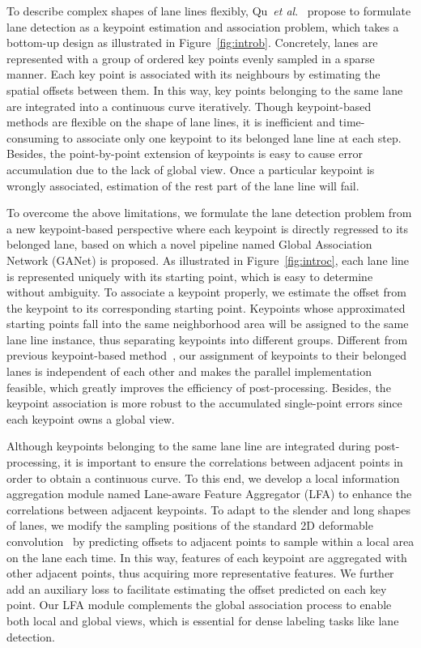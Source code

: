 \documentclass[10pt,twocolumn,letterpaper]{article}
\begin{document}
To describe complex shapes of lane lines flexibly, Qu~\textit{et al}.~\cite{Qu_2021_CVPR} propose to formulate lane detection as a keypoint estimation and association problem, which takes a bottom-up design as illustrated in Figure~\ref{fig:introb}.
Concretely, lanes are represented with a group of ordered key points evenly sampled in a sparse manner. 
Each key point is associated with its neighbours by estimating the spatial offsets between them.
In this way, key points belonging to the same lane are integrated into a continuous curve iteratively.
Though keypoint-based methods are flexible on the shape of lane lines, it is inefficient and time-consuming to associate only one keypoint to its belonged lane line at each step.
Besides, the point-by-point extension of keypoints is easy to cause error accumulation due to the lack of global view.
Once a particular keypoint is wrongly associated, estimation of the rest part of the lane line will fail.

To overcome the above limitations, we formulate the lane detection problem from a new keypoint-based perspective where each keypoint is directly regressed to its belonged lane, based on which a novel pipeline named Global Association Network (GANet) is proposed.
As illustrated in Figure~\ref{fig:introc}, each lane line is represented uniquely with its starting point, which is easy to determine without ambiguity.
To associate a keypoint properly, we estimate the offset from the keypoint to its corresponding starting point.
Keypoints whose approximated starting points fall into the same neighborhood area will be assigned to the same lane line instance, thus separating keypoints into different groups. 
Different from previous keypoint-based method~\cite{Qu_2021_CVPR}, our assignment of keypoints to their belonged lanes is independent of each other and makes the parallel implementation feasible, which greatly improves the efficiency of post-processing.
Besides, the keypoint association is more robust to the accumulated single-point errors since each keypoint owns a global view.

Although keypoints belonging to the same lane line are integrated during post-processing, it is important to ensure the correlations between adjacent points in order to obtain a continuous curve.
To this end, we develop a local information aggregation module named Lane-aware Feature Aggregator (LFA) to enhance the correlations between adjacent keypoints.
To adapt to the slender and long shapes of lanes, we modify the sampling positions of the standard 2D deformable convolution~\cite{dai2017deformable} by predicting offsets to adjacent points to sample within a local area on the lane each time. 
In this way, features of each keypoint are aggregated with other adjacent points, thus acquiring more representative features.
We further add an auxiliary loss to facilitate estimating the offset predicted on each key point.
Our LFA module complements the global association process to enable both local and global views, which is essential for dense labeling tasks like lane detection.
\end{document}

